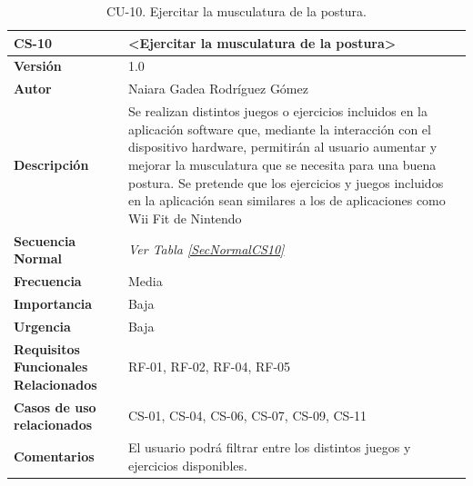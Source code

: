 \begin{table}[h!]
\centering
\begin{tabular}{ |m{3cm}|m{11cm}|  } 
\hline
\cellcolor[HTML]{B9E3F0}\textbf{CS-10} & \cellcolor[HTML]{B9E3F0}\textbf{<Ejercitar la musculatura de la postura>}\\

\hline
\cellcolor[HTML]{EFEFEF}\textbf{Versión}             & 1.0  \\
\hline
\cellcolor[HTML]{EFEFEF}\textbf{Autor}                & Naiara Gadea Rodríguez Gómez\\
\hline
\cellcolor[HTML]{EFEFEF}\textbf{Descripción}                & {Se realizan distintos juegos o ejercicios incluidos en la aplicación software que, mediante la interacción con el dispositivo hardware, permitirán al usuario aumentar y mejorar la musculatura que se necesita para una buena postura. Se pretende que los ejercicios y juegos incluidos en la aplicación sean similares a los de aplicaciones como Wii Fit de Nintendo \cite{WiiFit}}\\
\hline
\cellcolor[HTML]{EFEFEF}\textbf{Secuencia \newline Normal}                &        {\textit{Ver Tabla \ref{SecNormalCS10}}}       \\  
\hline
\cellcolor[HTML]{EFEFEF}\textbf{Frecuencia}                & Media\\
\hline
\cellcolor[HTML]{EFEFEF}\textbf{Importancia}                & Baja\\
\hline
\cellcolor[HTML]{EFEFEF}\textbf{Urgencia}                & Baja\\
\hline
\cellcolor[HTML]{EFEFEF}\textbf{Requisitos Funcionales Relacionados}                & {RF-01, RF-02, RF-04, RF-05 }\\
\hline
\cellcolor[HTML]{EFEFEF}\textbf{Casos de uso relacionados}                & {CS-01, CS-04, CS-06, CS-07, CS-09, CS-11}\\
\hline
\cellcolor[HTML]{EFEFEF}\textbf{Comentarios}                & {El usuario podrá filtrar entre los distintos juegos y ejercicios disponibles.}\\
\hline
\end{tabular}
\caption{CU-10. Ejercitar la musculatura de la postura.}
\end{table}

